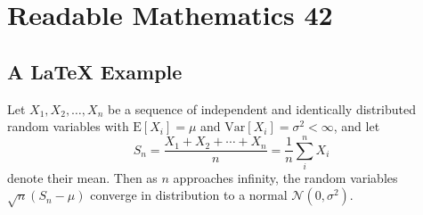 \documentclass[
  10pt,
  aspectratio=169,
  xcolor={dvipsnames,table,x11names},  %
]{beamer}
\begin{document}
\section{Readable Mathematics 42}
  \subsection{A \LaTeX{} Example}

\UpdateGWthemeOptions[secsubsecseparator=\GWthemeStarredbullet]  %

\begin{frame}

  Let $X_1, X_2, \ldots, X_n$ be a sequence of independent and identically distributed random variables with $\text{E}[X_i] = \mu$ and $\text{Var}[X_i] = \sigma^2 < \infty$, and let
  $$S_n = \frac{X_1 + X_2 + \cdots + X_n}{n}
        = \frac{1}{n}\sum_{i}^{n} X_i$$
  denote their mean. Then as $n$ approaches infinity, the random variables $\sqrt{n}(S_n - \mu)$ converge in distribution to a normal $\mathcal{N}(0, \sigma^2)$.

\end{frame}
\end{document}
